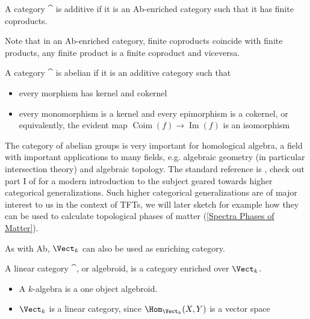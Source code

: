 \begin{defn}
    A category $\cat$ is additive if it is an Ab-enriched category such that it has finite coproducts.
\end{defn}
Note that in an Ab-enriched category, finite coproducts coincide with finite products, any finite product is a
finite coproduct and viceversa.
\begin{defn}\label{AbelianCat}
    A category $\cat$ is abelian if it is an additive category such that 
    \begin{itemize}
        \item every morphism has kernel and cokernel
        \item every monomorphism is a kernel and every epimorphism is a cokernel, or equivalently,
        the evident map $\operatorname{Coim}(f)\to \operatorname{Im}(f)$ is an isomorphism
    \end{itemize}
\end{defn}
\begin{rem}
    The category of abelian groups is very important for homological algebra, 
    a field with important applications to many fields, e.g. algebraic geometry (in particular intersection theory) and algebraic topology. The standard reference is \cite{weibel1994introduction}, check out part I of \cite{Mazel-Gee2024} for a modern introduction to the subject geared towards higher categorical generalizations. Such higher categorical generalizations are of major interest to us in the context of TFTs, we will later sketch for example how they can be used to calculate topological phases of matter (\ref{Spectra Phases of Matter}). 
\end{rem}


As with Ab, $\Vect_k$ can also be used as enriching category.
\begin{defn}
     A linear category $\cat$, or algebroid, is a category enriched over $\Vect_k$.
\end{defn}
\begin{ex}
\hfill
    \begin{itemize}
        \item A $k$-algebra is a one object algebroid.
        \item $\Vect_k$ is a linear category, since $\Hom_{\Vect_{k}}(X,Y)$ is a vector space
    \end{itemize}
\end{ex}

